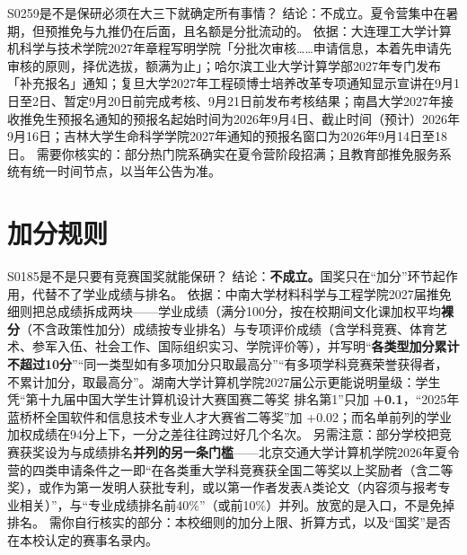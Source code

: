 \begin{qa}{S0259}{是不是保研必须在大三下就确定所有事情？}
结论：不成立。夏令营集中在暑期，但预推免与九推仍在后面，且名额是分批流动的。
依据：大连理工大学计算机科学与技术学院2027年章程写明学院「分批次审核……申请信息，本着先申请先审核的原则，择优选拔，额满为止」；哈尔滨工业大学计算学部2027年专门发布「补充报名」通知；复旦大学2027年工程硕博士培养改革专项通知显示宣讲在9月1日至2日、暂定9月20日前完成考核、9月21日前发布考核结果；南昌大学2027年接收推免生预报名通知的预报名起始时间为2026年9月4日、截止时间（预计）2026年9月16日；吉林大学生命科学学院2027年通知的预报名窗口为2026年9月14日至18日。
需要你核实的：部分热门院系确实在夏令营阶段招满；且教育部推免服务系统有统一时间节点，以当年公告为准。
\end{qa}

\section{加分规则}
\begin{qa}{S0185}{是不是只要有竞赛国奖就能保研？}
结论：\textbf{不成立。}国奖只在“加分”环节起作用，代替不了学业成绩与排名。
依据：中南大学材料科学与工程学院2027届推免细则把总成绩拆成两块——学业成绩（满分100分，按在校期间文化课加权平均\textbf{裸分}（不含政策性加分）成绩按专业排名）与专项评价成绩（含学科竞赛、体育艺术、参军入伍、社会工作、国际组织实习、学院评价等），并写明“\textbf{各类型加分累计不超过10分}”“同一类型如有多项加分只取最高分”“有多项学科竞赛荣誉获得者，不累计加分，取最高分”。湖南大学计算机学院2027届公示更能说明量级：学生凭“第十九届中国大学生计算机设计大赛国赛二等奖 排名第1”只加 \textbf{+0.1}，“2025年蓝桥杯全国软件和信息技术专业人才大赛省二等奖”加 +0.02；而名单前列的学业加权成绩在94分上下，一分之差往往跨过好几个名次。
另需注意：部分学校把竞赛获奖设为与成绩排名\textbf{并列的另一条门槛}——北京交通大学计算机学院2026年夏令营的四类申请条件之一即“在各类重大学科竞赛获全国二等奖以上奖励者（含二等奖），或作为第一发明人获批专利，或以第一作者发表A类论文（内容须与报考专业相关）”，与“专业成绩排名前40\%”（或前10\%）并列。放宽的是入口，不是免掉排名。
需你自行核实的部分：本校细则的加分上限、折算方式，以及“国奖”是否在本校认定的赛事名录内。
\end{qa}

